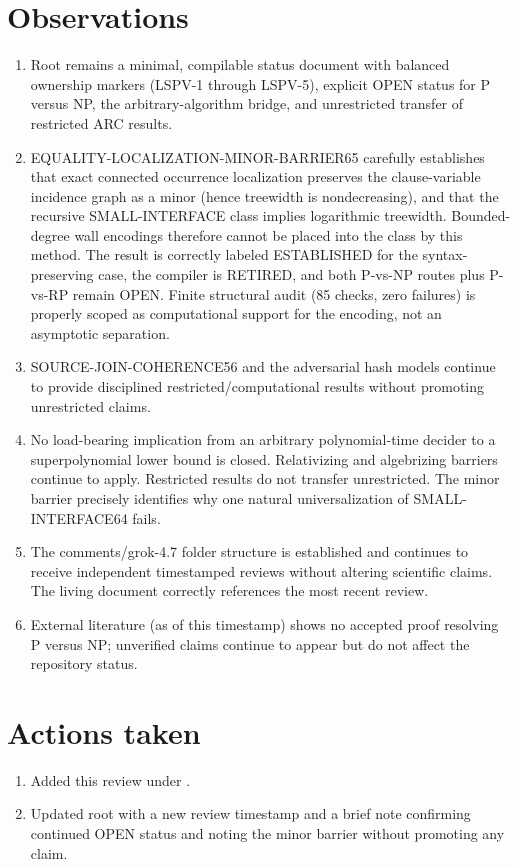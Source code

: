 \documentclass[11pt]{article}
\begin{document}
\section{Observations}
\begin{enumerate}
\item Root  remains a minimal, compilable status document with balanced ownership markers (LSPV-1 through LSPV-5), explicit OPEN status for P versus NP, the arbitrary-algorithm bridge, and unrestricted transfer of restricted ARC results.
\item EQUALITY-LOCALIZATION-MINOR-BARRIER65 carefully establishes that exact connected occurrence localization preserves the clause-variable incidence graph as a minor (hence treewidth is nondecreasing), and that the recursive SMALL-INTERFACE class implies logarithmic treewidth. Bounded-degree wall encodings therefore cannot be placed into the class by this method. The result is correctly labeled ESTABLISHED for the syntax-preserving case, the compiler is RETIRED, and both P-vs-NP routes plus P-vs-RP remain OPEN. Finite structural audit (85 checks, zero failures) is properly scoped as computational support for the encoding, not an asymptotic separation.
\item SOURCE-JOIN-COHERENCE56 and the adversarial hash models continue to provide disciplined restricted/computational results without promoting unrestricted claims.
\item No load-bearing implication from an arbitrary polynomial-time decider to a superpolynomial lower bound is closed. Relativizing and algebrizing barriers continue to apply. Restricted results do not transfer unrestricted. The minor barrier precisely identifies why one natural universalization of SMALL-INTERFACE64 fails.
\item The comments/grok-4.7 folder structure is established and continues to receive independent timestamped reviews without altering scientific claims. The living document correctly references the most recent review.
\item External literature (as of this timestamp) shows no accepted proof resolving P versus NP; unverified claims continue to appear but do not affect the repository status.
\end{enumerate}

\section{Actions taken}
\begin{enumerate}
\item Added this review under .
\item Updated root  with a new review timestamp and a brief note confirming continued OPEN status and noting the minor barrier without promoting any claim.
\end{enumerate}
\end{document}
